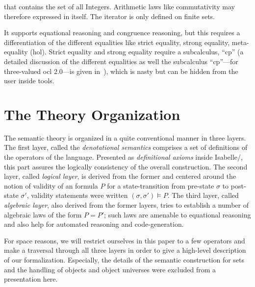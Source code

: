 \begin{compactenum}
  that contains the set of all Integers.  Arithmetic laws like
  commutativity may therefore expressed in \OCL itself.  The
  iterator is only defined on finite sets.
\item It supports equational reasoning and congruence reasoning, but
  this requires a differentiation of the different equalities like
  strict equality, strong equality, meta-equality (\acs{hol}). Strict
  equality and strong equality require a subcalculus, ``cp'' (a
  detailed discussion of the different equalities as well the
  subcalculus ``cp''---for three-valued \acs{ocl} 2.0---is given
  in~\cite{brucker.ea:semantics:2009}), which is nasty but can be
  hidden from the user inside tools.
\end{compactenum}

\section{The Theory Organization}
The semantic theory is organized in a quite conventional manner in
three layers. The first layer, called the \emph{denotational
  semantics} comprises a set of definitions of the operators of the
language.  Presented as \emph{definitional axioms} inside
Isabelle/\HOL, this part assures the logically consistency of the
overall construction. The second layer, called \emph{logical layer},
is derived from the former and centered around the notion of validity
of an \OCL formula $P$ for a state-transition from pre-state $\sigma$
to post-state $\sigma'$, validity statements were written $(\sigma,
\sigma') \models P$.  The third layer, called \emph{algebraic layer},
also derived from the former layers, tries to establish a number of
algebraic laws of the form $P = P'$; such laws are amenable to
equational reasoning and also help for automated reasoning and
code-generation.

For space reasons, we will restrict ourselves in this paper to a few
operators and make a traversal through all three layers in order to
give a high-level description of our formalization.  Especially, the
details of the semantic construction for sets and the handling of
objects and object universes were excluded from a presentation here.

